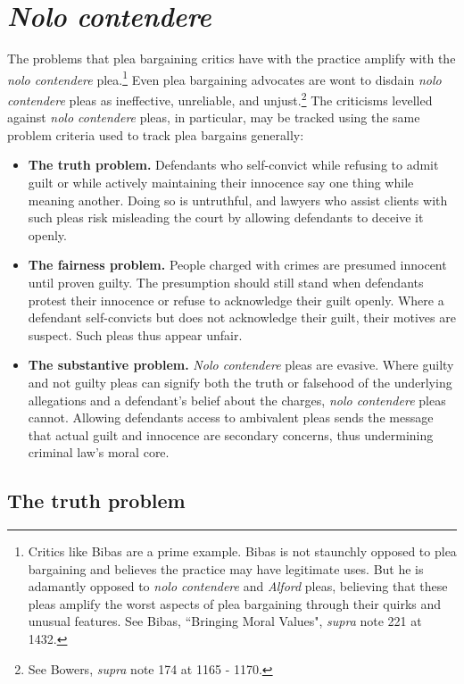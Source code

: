 \section{\textit{Nolo contendere}}

The problems that plea bargaining critics have with the practice amplify with the \textit{nolo contendere} plea.\footnote{Critics like Bibas are a prime example. Bibas is not staunchly opposed to plea bargaining and believes the practice may have legitimate uses. But he is adamantly opposed to \textit{nolo contendere} and \textit{Alford} pleas, believing that these pleas amplify the worst aspects of plea bargaining through their quirks and unusual features. See Bibas, ``Bringing Moral Values", \textit{supra} note 221 at 1432.} Even plea bargaining advocates are wont to disdain \textit{nolo contendere} pleas as ineffective, unreliable, and unjust.\footnote{See Bowers, \textit{supra} note 174 at 1165 - 1170.} The criticisms levelled against \textit{nolo contendere} pleas, in particular, may be tracked using the same problem criteria used to track plea bargains generally:

\begin{itemize}
    \item \textbf{The truth problem.} Defendants who self-convict while refusing to admit guilt or while actively maintaining their innocence say one thing while meaning another. Doing so is untruthful, and lawyers who assist clients with such pleas risk misleading the court by allowing defendants to deceive it openly. 
    \item \textbf{The fairness problem.} People charged with crimes are presumed innocent until proven guilty. The presumption should still stand when defendants protest their innocence or refuse to acknowledge their guilt openly. Where a defendant self-convicts but does not acknowledge their guilt, their motives are suspect. Such pleas thus appear unfair. 
    \item \textbf{The substantive problem.} \textit{Nolo contendere} pleas are evasive. Where guilty and not guilty pleas can signify both the truth or falsehood of the underlying allegations and a defendant's belief about the charges, \textit{nolo contendere} pleas cannot. Allowing defendants access to ambivalent pleas sends the message that actual guilt and innocence are secondary concerns, thus undermining criminal law's moral core. 
    
\end{itemize}

\subsection{The truth problem}

